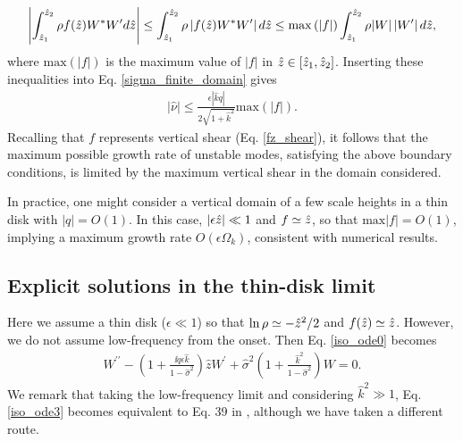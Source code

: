 \begin{align}
  \left|\int_{\hat{z}_1}^{\hat{z}_2}\rho
    f(\hat{z}) W^*W^\prime d\hat{z}\right|\leq \int_{\hat{z}_1}^{\hat{z}_2}\rho
  \left|f(\hat{z})W^*W^\prime \right|d\hat{z}
  \leq
  \mathrm{max}\left(|f|\right)\int_{\hat{z}_1}^{\hat{z}_2}\rho
  |W|\left|W^\prime \right|d\hat{z},
\end{align}
where $\mathrm{max}(|f|)$ is the maximum value of $|f|$ in
$\hat{z}\in[\hat{z}_1,\hat{z}_2]$. Inserting these inequalities into
Eq. \ref{sigma_finite_domain} gives
\begin{align}\label{max_growth}
  |\hat{\nu}|\leq
  \frac{\epsilon |\hat{k} q|}{2\sqrt{1+\hat{k}^2}}\mathrm{max}(|f|). 
\end{align}
Recalling that $f$ represents vertical shear (Eq. \ref{fz_shear}), it
follows that the maximum possible growth rate of unstable modes,
satisfying the above boundary conditions, is limited by the maximum
vertical shear in the domain considered.  

In practice, one might consider a vertical domain of a few scale 
heights in a thin disk with $|q|=O(1)$. In this case, $|\epsilon\hat{z}|\ll1$ and  
$f\simeq \hat{z}$, so that $\mathrm{max}|f| = O(1)$, implying a
maximum growth rate $O(\epsilon \Omega_k)$, consistent with numerical
results. 


\subsection{Explicit solutions in the thin-disk limit}\label{iso_explicit}
Here we assume a thin disk ($\epsilon\ll1$) so that $\ln\rho\simeq
-\hat{z}^2/2$ and $f(\hat{z})\simeq \hat{z}$. However, we do not assume 
low-frequency from the onset. Then Eq. \ref{iso_ode0} becomes 
\begin{align}\label{iso_ode3}
  W^{\prime\prime} - \left(1 + \frac{\ii q\epsilon \hat{k}}{1-\hat{\sigma}^2}\right)\hat{z}W^\prime  +
  \hat{\sigma}^2\left(1+\frac{\hat{k}^2}{1-\hat{\sigma}^2}\right)W = 0.
\end{align}
We remark that taking the low-frequency limit and considering
$\hat{k}^2\gg 1$, Eq. \ref{iso_ode3} becomes equivalent to Eq. 39 in
\cite{nelson13}, although we have taken a different route.   
 
